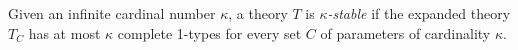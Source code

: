 Given an infinite cardinal number $\kappa$, a theory $T$ is \textit{$\kappa$-stable} if the expanded theory $T_C$ has at most $\kappa$ complete 1-types for every set $C$ of parameters of cardinality $\kappa$.
